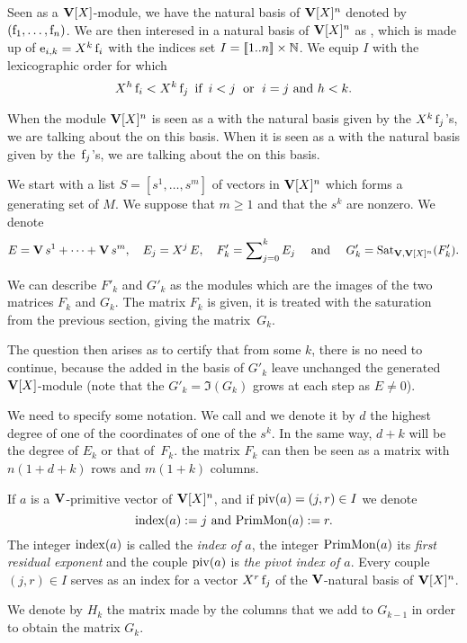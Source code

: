 Seen as a $\mathbf{V}[X]$-module,  we have the natural basis of   $\mathbf{V}[X]^n$
denoted by $(\mathrm{f}_1,\dots,\mathrm{f}_n)$.
We are then interesed in  a natural basis of  $\mathbf{V}[X]^n$ as \Vmo, which is made up of $\mathrm{e}_{i,k}=X^k\,\mathrm{f}_i$ with the indices set  $I=[ \negthinspace [1..n] \negthinspace ]\times \mathbb{N}$.
We equip $I$ with the  lexicographic order for which
 $$
X^h\, \mathrm{f}_i < X^k\,\mathrm{f}_j \,\hbox{ if }\, i<j \;\hbox{ or } \;i=j \hbox{ and } h<k.
 $$

When the module $\mathbf{V}[X]^{n}$ is seen as a \Vmo with the natural basis given by the $X^k\,\mathrm{f}_j$’s, we are talking about the \gui{\coos} on this basis.
When it is seen as a  \VXmo  with the natural basis given by the~$\mathrm{f}_j$’s,
we are talking about the \gui{\coes} on this basis.

We start with a  list $S=[s^1,\dots,s^m]$ of vectors in
 $\mathbf{V}[X]^n$ which forms a  generating set of $M$.
We suppose \spdg that $m\geq 1$ and that the $s^k$ are nonzero.
We denote
$$
E=\mathbf{V}\,s^1+\cdots+\mathbf{V}\,s^m,\quad E_j=X^j\,E,\quad F'_k=\sum\nolimits_{j=0}^kE_j \quad\hbox{ and }\quad G'_k=\mathrm{Sat}_{\mathbf{V},\mathbf{V}[X]^n}(F'_k).
$$

We can describe   $F'_k$ and $G'_k$ as the modules which are the images of the two matrices
$F_k$ and $G_k$. The matrix $F_k$ is given, it is treated with the saturation \algo
from the previous section, giving the matrix~$G_k$.

The question then arises as to  certify that from  some $k$,
there is no need to continue, because the \elts added in the basis of $G'_k$
 leave unchanged  the generated $\mathbf{V}[X]$-module (note that the \Vmo $G'_k=\Im(G_k)$ grows at each step as  $E\neq 0$).

\medskip We need to specify some  notation.
We call  and we denote it by $d$ the highest degree of one of the coordinates of one of the  $s^{k}$.
In the same way, $d+k$ will be the  degree of
$E_k$ or that of~$F_k$. the matrix $F_k$ can then be seen as a matrix
with $n(1+d+k)$ rows and $m(1+k)$ columns.

If $a$ is a $\mathbf{V}$-primitive  vector of $\mathbf{V}[X]^n$, and if $\mathrm{piv}(a)=(j,r)\in I$ we denote
$$
\mathrm{index}(a) := j \hbox{ and } \mathrm{PrimMon}(a) :=r.
$$
The integer $\mathrm{index}(a)$ is called the  \textsl{index of $a$}, the integer $\mathrm{PrimMon}(a)$
its \textsl{first residual exponent} and the couple  $\mathrm{piv}(a)$ is \textsl{the pivot index of  $a$}. Every couple $(j,r)\in I$ serves as an index for a vector  $X^{r}\,\mathrm{f}_{j}$ of the $\mathbf{V}$-natural basis of $\mathbf{V}[X]^n$.

We denote by $H_k$ the  matrix made by the columns that we add to  $G_{k-1}$
in order to obtain the   matrix $G_k$.


